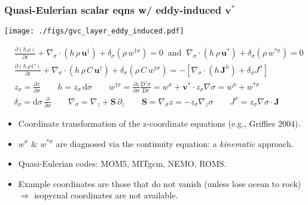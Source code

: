 \documentclass[10pt]{beamer}
\begin{document}
\begin{frame}
  \frametitle{Quasi-Eulerian scalar eqns w/ eddy-induced ${\bm v}^{*}$}

\begin{center}
\vspace{-.3cm}
{\texttt{[image: ./figs/gvc\_layer\_eddy\_induced.pdf]}}
\end{center}
\vspace{-.5cm}

\begin{align}
  &\frac{\partial (h \, \rho)}{\partial  t} + \nabla_{\sigma} \cdot (h \, \rho \, {\bm u}^{\dagger} ) 
 + \delta_{\sigma} (\rho \, w^{\dagger \sigma} ) 
 = 0 
 \; \; \mbox{and} \; \; \nabla_{\sigma} \cdot ( h \, \rho \, {\bm u}^{*})  + \delta_{\sigma} (\rho \, w^{*\sigma} ) = 0 
\\
  &\frac{\partial (h \, \rho \, C)}{\partial  t} + \nabla_{\sigma} \cdot (h \, \rho \, C \, {\bm u}^{\dagger} ) 
 + \delta_{\sigma} (\rho \, C \, w^{\dagger \sigma} ) 
 =
 -\left[  \nabla_{\sigma} \cdot ( h \, {\bm J}^{h}) +  \delta_{\sigma} J^{\sigma} \right] 
 \\
  &z_{\sigma} = \frac{\partial z}{\partial \sigma} 
  \qquad h = z_{\sigma} \, \mathrm{d}\sigma 
  \qquad w^{\dagger \sigma} =  \frac{\partial z}{\partial \sigma}  \frac{ \mathrm{D}^{\dagger} \sigma}{\mathrm{D}t} 
  = w^{\sigma} + {\bm v}^{*}\cdot z_{\sigma} \nabla \sigma = w^{\sigma}  + w^{*\sigma} 
 \\
 &\delta_{\sigma} = \mathrm{d}\sigma \, \frac{\partial}{\partial \sigma}
 \qquad \nabla_{\sigma} = \nabla_{z} + {\bm S} \, \partial_{z}
 \qquad {\bm S}  = \nabla_{\sigma} z = -z_{\sigma}  \nabla_{z}\sigma
 \qquad J^{\sigma}  = z_{\sigma}  \nabla \sigma  \cdot {\bm J} 
\label{eq:gvc-mass-tracer-equation}
\end{align}

\begin{exampleblock}{}
\begin{itemize}
\item Coordinate transformation of the z-coordinate equations (e.g., Griffies 2004).  
\item $w^{\sigma}$ \& $w^{*\sigma} $ are diagnosed via the continuity
  equation: a {\it kinematic} approach.
\item Quasi-Eulerian codes: MOM5, MITgcm, NEMO, ROMS.
\item Example coordinates are those that do not vanish (unless lose
  ocean to rock)  $\Longrightarrow$ isopycnal coordinates are not available. 
\end{itemize}
\end{exampleblock}{}

\end{frame}
\end{document}
